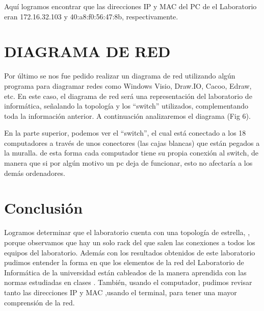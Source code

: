 \documentclass[onecolumn,11pts]{IEEEtran}
\begin{document}
        Aquí logramos encontrar que las direcciones IP y MAC del PC de el Laboratorio eran  172.16.32.103 y 40:a8:f0:56:47:8b, respectivamente.
        
        
\section {DIAGRAMA DE RED}
        Por último se nos fue pedido realizar un diagrama de red utilizando algún programa para diagramar redes como Windows Visio, Draw.IO, Cacoo, Edraw, etc.
          En este caso, el diagrama de red será una representación del laboratorio de informática, señalando la topología y los “switch” utilizados, complementando toda la información anterior. A continuación analizaremos el diagrama (Fig 6).

        
        En la parte superior, podemos ver el “switch”, el cual está conectado a los 18 computadores a través de unos conectores (las cajas blancas) que están pegados a la muralla. de esta forma cada computador tiene su propia conexión al switch, de manera que si por algún motivo un pc deja de funcionar, esto no afectaría a los demás ordenadores.
        
\section{Conclusión}
Logramos determinar que el laboratorio cuenta con una topología de estrella, , porque observamos que hay un solo rack del que salen las conexiones a todos los equipos del laboratorio.    Además con los resultados obtenidos de este laboratorio pudimos entender la forma en que los elementos de la red del Laboratorio de Informática de la universidad están cableados de la manera aprendida con las normas estudiadas en clases . También, usando el computador, pudimos revisar tanto las direcciones  IP y MAC ,usando el terminal,  para tener una mayor comprensión de la red.

\newpage
\end{document}
